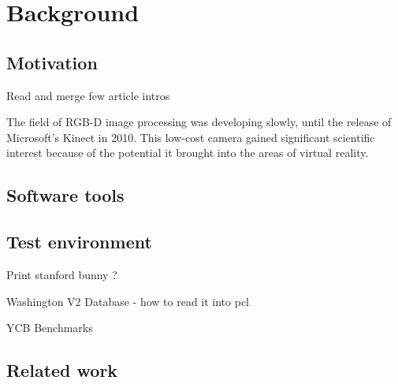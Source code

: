 \chapter{Background}
\label{cha:background}




\section{Motivation}
\label{sec:motivation}

Read and merge few article intros


The field of RGB-D image processing was developing slowly, until the release of Microsoft's Kinect in 2010. This low-cost camera gained significant scientific interest because of the potential it brought into the areas of virtual reality.




\section{Software tools}
\label{sec:software}



\section{Test environment}
\label{sec:testhardware}


Print stanford bunny ?

Washington V2 Database - how to read it into pcl



YCB Benchmarks 


\section{Related work}
\label{sec:related}



